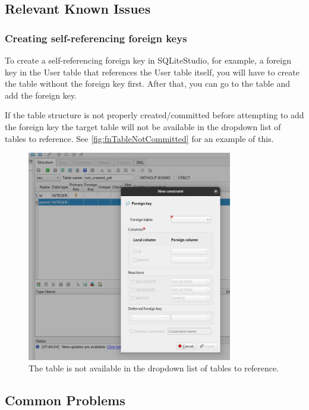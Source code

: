 \documentclass[a4paper,11pt,oneside]{article}
\begin{document}
\begin{sloppypar}
\subsection{Relevant Known Issues}
\label{sqliteStudioKnownIssues}

\subsubsection{Creating self-referencing foreign keys}
\label{sqliteStudioSelfReferencingForeignKeys}
To create a self-referencing foreign key in SQLiteStudio, for example, a foreign key in the User table that references the User table itself, you will have to create the table without the foreign key first. After that, you can go to the table and add the foreign key.

If the table structure is not properly created/committed before attempting to add the foreign key the target table will not be available in the dropdown list of tables to reference. See \autoref{fig:fnTableNotCommitted} for an example of this.

\begin{figure}[!htb]
  \centering
  \includegraphics[width=0.8\textwidth]{sqlitestudio/fn_table_not_committed.png}
  \caption{The table is not available in the dropdown list of tables to reference.}
  \label{fig:fnTableNotCommitted}
\end{figure}


\subsection{Common Problems}
\label{sqliteStudioCommonProblems}


\end{sloppypar}
\end{document}
